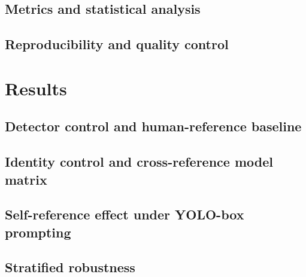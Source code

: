 \documentclass{elektr}
\begin{document}
\subsection*{Metrics and statistical analysis}

\subsection*{Reproducibility and quality control}

\section*{Results} \label{sec:results}

\subsection*{Detector control and human-reference baseline}

\subsection*{Identity control and cross-reference model matrix}

\subsection*{Self-reference effect under YOLO-box prompting}

\subsection*{Stratified robustness}
\end{document}
